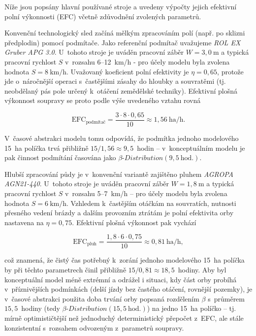 \documentclass[11pt,a4paper]{article}
\newcounter{subsubsubsection}[subsubsection]
\begin{document}
Níže jsou popsány hlavní používané stroje a uvedeny výpočty jejich efektivní polní výkonnosti (EFC) včetně zdůvodnění zvolených parametrů.


Konvenční technologický sled začíná mělkým zpracováním polí (např. po sklizni předplodin) pomocí podmítače. Jako referenční podmítač uvažujeme \emph{ROL EX Gruber APG 3.0}\cite{eshop-zp-podmítač}. U~tohoto stroje je uváděn pracovní záběr $W = 3,0~\text{m}$ a typická pracovní rychlost $S$ v~rozsahu 6--12~km/h - pro účely modelu byla zvolena hodnota $S = 8~\text{km/h}$. Uvažovaný koeficient polní efektivity je $\eta = 0,65$, protože jde o~náročnější operaci s~častějšími zásahy do hloubky a souvratěmi (tj. neobdělaný pás pole určený k~otáčení zemědělské techniky\cite{wikipedia-souvrať}). Efektivní plošná výkonnost soupravy se proto podle výše uvedeného vztahu rovná

$$
\text{EFC}_{\text{podmítač}} = \frac{3 \cdot 8 \cdot 0,65}{10} \approx 1,56~\text{ha/h}.
$$

V~časové abstrakci modelu tomu odpovídá, že podmítka jednoho modelového 15~ha políčka trvá přibližně $15/1,56 \approx 9,5$~hodin -- v~konceptuálním modelu je pak činnost podmítání časována jako $\beta\text{-}Distribution(9,5~\text{hod.})$.


Hlubší zpracování půdy je v~konvenční variantě zajištěno pluhem \emph{AGROPA AGN21-440}\cite{eshop-zp-pluh}. U~tohoto stroje je uváděn pracovní záběr $W = 1,8~\text{m}$ a typická pracovní rychlost $S$ v~rozsahu 5--7~km/h -- pro účely modelu byla zvolena hodnota $S = 6~\text{km/h}$. Vzhledem k~častějším otáčkám na souvratích, nutnosti přesného vedení brázdy a dalším provozním ztrátám je polní efektivita orby nastavena na $\eta = 0,75$. Efektivní plošná výkonnost pak vychází

$$
\text{EFC}_{\text{pluh}} = \frac{1,8 \cdot 6 \cdot 0,75}{10} \approx 0,81~\text{ha/h},
$$

což znamená, že čistý čas potřebný k~zorání jednoho modelového 15~ha políčka by při těchto parametrech činil přibližně $15/0,81 \approx 18,5$~hodiny. Aby byl konceptuální model méně extrémní a odrážel i situaci, kdy část orby probíhá v~příznivějších podmínkách (delší jízdy bez častého otáčení, rovnější pozemky), je v~časové abstrakci použita doba trvání orby popsaná rozdělením $\beta$ s~průměrem $15,5$~hodiny (tedy $\beta\text{-}Distribution(15,5~\text{hod.})$) na jedno 15~ha políčko -- tj. mírně optimističtější než jednoduchý deterministický přepočet z~EFC, ale stále konzistentní s~rozsahem odvozeným z~parametrů soupravy.
\end{document}
